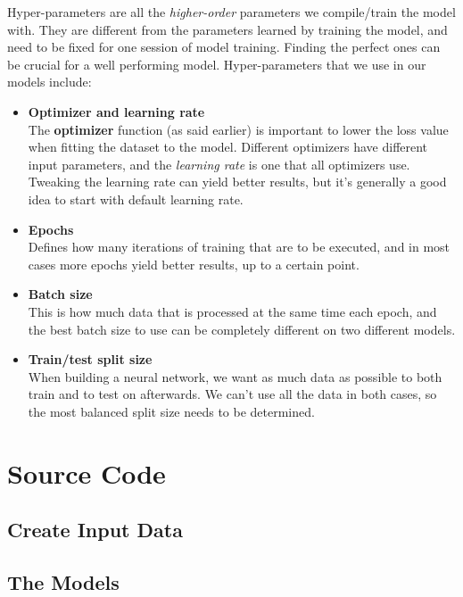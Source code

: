 Hyper-parameters are all the \textit{higher-order} parameters we compile/train the model with. They are different from the parameters learned by
training the model, and need to be fixed for one session of model training. Finding the perfect ones can be crucial for a well performing model. 
Hyper-parameters that we use in our models include:

\begin{itemize}
    \item \textbf{Optimizer and learning rate}\\
        The \textbf{optimizer} function (as said earlier) is important to lower the loss value when fitting the dataset to the model. 
        Different optimizers have different input parameters, and the \textit{learning rate} is one that all optimizers use. 
        Tweaking the learning rate can yield better results, 
        but it's generally a good idea to start with default learning rate. %
    \item \textbf{Epochs}\\
        Defines how many iterations of training that are to be executed, and in most cases more epochs yield better results, 
        up to a certain point.
    \item \textbf{Batch size}\\
        This is how much data that is processed at the same time each epoch, and the best batch size to use can be completely different on 
        two different models.  
    \item \textbf{Train/test split size}\\
        When building a neural network, we want as much data as possible to both train and to test on afterwards. We can't use all the data 
        in both cases, so the most balanced split size needs to be determined.
\end{itemize}

\newpage

\section{Source Code}
\subsection{Create Input Data}


\newpage
\subsection{The Models}


